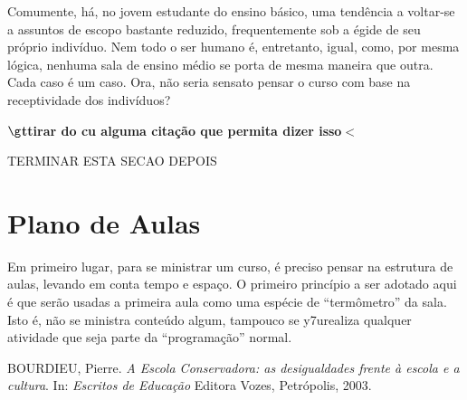 \documentclass[12pt,a4paper]{article}
\begin{document}
	Comumente, há, no jovem estudante do ensino básico, uma tendência a 
	voltar-se a assuntos de escopo bastante reduzido, frequentemente sob 
	a égide de seu próprio indivíduo. Nem todo o ser humano é, entretanto, igual, 
	como, por mesma lógica, nenhuma sala de ensino médio se porta de mesma 
	maneira que outra. Cada caso é um caso. Ora, não seria sensato pensar 
	o curso com base na receptividade dos indivíduos? 
	
	\textbf{$\g$ttirar do cu alguma citação que permita dizer isso$\lt$}
	
	TERMINAR ESTA SECAO DEPOIS
	
	\newpage
	
	\section{Plano de Aulas}
	
	Em primeiro lugar, para se ministrar um curso, é preciso pensar na 
	estrutura de aulas, levando em conta tempo e espaço. O primeiro 
	princípio a ser adotado aqui é que serão usadas a primeira aula 
	como uma espécie de ``termômetro'' da sala. Isto é, não se ministra 
	conteúdo algum, tampouco se y7urealiza qualquer atividade que seja parte 
	da ``programação'' normal. 
	
	\newpage
	
	\begin{thebibliography}{9}
		
		BOURDIEU, Pierre. 
		\textit{A Escola Conservadora: as desigualdades frente à escola e a cultura}. 
		In: \textit{Escritos de Educação} 
		Editora Vozes, Petrópolis, 2003.
		
	\end{thebibliography}
	
	
	
\end{document}

